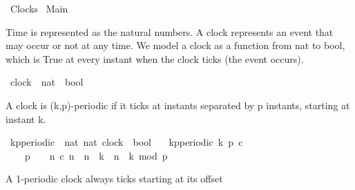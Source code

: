 %
\begin{isabellebody}%
%
%
\isadelimtheory
%
\endisadelimtheory
%
\isatagtheory
{}\isamarkupfalse%
\ Clocks\isanewline
\isanewline
\isanewline
{}\ Main\isanewline
\isanewline
{}%
\endisatagtheory
{\isafoldtheory}%
%
\isadelimtheory
%
\endisadelimtheory
%
\isadelimdocument
%
\endisadelimdocument
%
\isatagdocument
%
\isamarkuptrue%
%
\endisatagdocument
{\isafolddocument}%
%
\isadelimdocument
%
\endisadelimdocument
%
\begin{isamarkuptext}%
Time is represented as the natural numbers.
A clock represents an event that may occur or not at any time.
We model a clock as a function from nat to bool, which is True at every
instant when the clock ticks (the event occurs).%
\end{isamarkuptext}\isamarkuptrue%
\isamarkupfalse%
\ clock\ {\isacharequal}\ {\isacartoucheopen}nat\ {\isasymRightarrow}\ bool{\isacartoucheclose}%
\isadelimdocument
%
\endisadelimdocument
%
\isatagdocument
%
\isamarkuptrue%
%
\endisatagdocument
{\isafolddocument}%
%
\isadelimdocument
%
\endisadelimdocument
%
\begin{isamarkuptext}%
A clock is (k,p)-periodic if it ticks at instants separated by p instants,
starting at instant k.%
\end{isamarkuptext}\isamarkuptrue%
\isamarkupfalse%
\ kp{\isacharunderscore}periodic\ {\isacharcolon}{\isacharcolon}\ {\isacartoucheopen}{\isacharbrackleft}nat{\isacharcomma}\ nat{\isacharcomma}\ clock{\isacharbrackright}\ {\isasymRightarrow}\ bool{\isacartoucheclose}\isanewline
\ \ \ {\isacartoucheopen}kp{\isacharunderscore}periodic\ k\ p\ c\ {\isasymequiv}\isanewline
\ \ \ \ {\isacharparenleft}p\ {\isachargreater}\ {}{\isacharparenright}\ {\isasymand}\ {\isacharparenleft}{\isasymforall}n{\isachardot}\ c\ n\ {\isacharequal}\ {\isacharparenleft}{\isacharparenleft}n\ {\isasymge}\ k{\isacharparenright}\ {\isasymand}\ {\isacharparenleft}{\isacharparenleft}n\ {\isacharminus}\ k{\isacharparenright}\ mod\ p\ {\isacharequal}\ {}{\isacharparenright}{\isacharparenright}{\isacharparenright}{\isacartoucheclose}%
\begin{isamarkuptext}%
A 1-periodic clock always ticks starting at its offset%
\end{isamarkuptext}\isamarkuptrue%
\isamarkupfalse%

\end{isabellebody}
